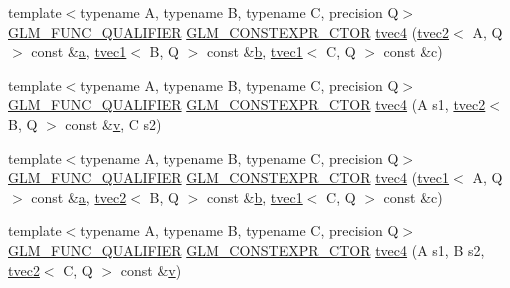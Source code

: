 \begin{DoxyCompactItemize}
\item 
{\footnotesize template$<$typename A, typename B, typename C, precision Q$>$ }\\\mbox{\hyperlink{setup_8hpp_a33fdea6f91c5f834105f7415e2a64407}{G\+L\+M\+\_\+\+F\+U\+N\+C\+\_\+\+Q\+U\+A\+L\+I\+F\+I\+ER}} \mbox{\hyperlink{setup_8hpp_ad34178a09666081abdb573c14d1f4a5a}{G\+L\+M\+\_\+\+C\+O\+N\+S\+T\+E\+X\+P\+R\+\_\+\+C\+T\+OR}} \mbox{\hyperlink{structglm_1_1tvec4_a959ee910b134382dde25fab416907997}{tvec4}} (\mbox{\hyperlink{structglm_1_1tvec2}{tvec2}}$<$ A, Q $>$ const \&\mbox{\hyperlink{glad_8h_ac8729153468b5dcf13f971b21d84d4e5}{a}}, \mbox{\hyperlink{structglm_1_1tvec1}{tvec1}}$<$ B, Q $>$ const \&\mbox{\hyperlink{glad_8h_a6eba317e3cf44d6d26c04a5a8f197dcb}{b}}, \mbox{\hyperlink{structglm_1_1tvec1}{tvec1}}$<$ C, Q $>$ const \&c)
\item 
{\footnotesize template$<$typename A, typename B, typename C, precision Q$>$ }\\\mbox{\hyperlink{setup_8hpp_a33fdea6f91c5f834105f7415e2a64407}{G\+L\+M\+\_\+\+F\+U\+N\+C\+\_\+\+Q\+U\+A\+L\+I\+F\+I\+ER}} \mbox{\hyperlink{setup_8hpp_ad34178a09666081abdb573c14d1f4a5a}{G\+L\+M\+\_\+\+C\+O\+N\+S\+T\+E\+X\+P\+R\+\_\+\+C\+T\+OR}} \mbox{\hyperlink{structglm_1_1tvec4_a8b7af1627a9ecb07b5c1a2f5dc43616d}{tvec4}} (A s1, \mbox{\hyperlink{structglm_1_1tvec2}{tvec2}}$<$ B, Q $>$ const \&\mbox{\hyperlink{glad_8h_a14cfbe2fc2234f5504618905b69d1e06}{v}}, C s2)
\item 
{\footnotesize template$<$typename A, typename B, typename C, precision Q$>$ }\\\mbox{\hyperlink{setup_8hpp_a33fdea6f91c5f834105f7415e2a64407}{G\+L\+M\+\_\+\+F\+U\+N\+C\+\_\+\+Q\+U\+A\+L\+I\+F\+I\+ER}} \mbox{\hyperlink{setup_8hpp_ad34178a09666081abdb573c14d1f4a5a}{G\+L\+M\+\_\+\+C\+O\+N\+S\+T\+E\+X\+P\+R\+\_\+\+C\+T\+OR}} \mbox{\hyperlink{structglm_1_1tvec4_af9833d7afc46eeb6770f0a08f7a8e169}{tvec4}} (\mbox{\hyperlink{structglm_1_1tvec1}{tvec1}}$<$ A, Q $>$ const \&\mbox{\hyperlink{glad_8h_ac8729153468b5dcf13f971b21d84d4e5}{a}}, \mbox{\hyperlink{structglm_1_1tvec2}{tvec2}}$<$ B, Q $>$ const \&\mbox{\hyperlink{glad_8h_a6eba317e3cf44d6d26c04a5a8f197dcb}{b}}, \mbox{\hyperlink{structglm_1_1tvec1}{tvec1}}$<$ C, Q $>$ const \&c)
\item 
{\footnotesize template$<$typename A, typename B, typename C, precision Q$>$ }\\\mbox{\hyperlink{setup_8hpp_a33fdea6f91c5f834105f7415e2a64407}{G\+L\+M\+\_\+\+F\+U\+N\+C\+\_\+\+Q\+U\+A\+L\+I\+F\+I\+ER}} \mbox{\hyperlink{setup_8hpp_ad34178a09666081abdb573c14d1f4a5a}{G\+L\+M\+\_\+\+C\+O\+N\+S\+T\+E\+X\+P\+R\+\_\+\+C\+T\+OR}} \mbox{\hyperlink{structglm_1_1tvec4_a7c5b0ba598e82707bb5004ae86530cdb}{tvec4}} (A s1, B s2, \mbox{\hyperlink{structglm_1_1tvec2}{tvec2}}$<$ C, Q $>$ const \&\mbox{\hyperlink{glad_8h_a14cfbe2fc2234f5504618905b69d1e06}{v}})

\end{DoxyCompactItemize}
